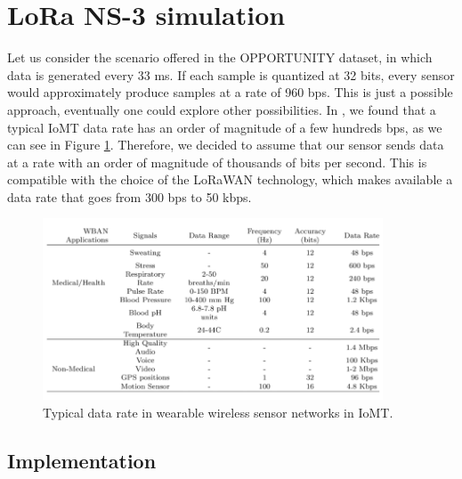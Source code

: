 \documentclass[10pt, a4paper, twocolumn]{article}
\theoremstyle{definition}
\begin{document}
\section{LoRa NS-3 simulation}
Let us consider the scenario offered in the OPPORTUNITY dataset, in which data is generated every 33 ms. If each sample is quantized at 32 bits, every sensor would approximately produce samples at a rate of 960 bps. This is just a possible approach, eventually one could explore other possibilities. In \cite{typical_values}, we found that a typical IoMT data rate has an order of magnitude of a few hundreds bps, as we can see in Figure \ref{fig:typical_vaulues}. Therefore, we decided to assume that our sensor sends data at a rate with an order of magnitude of thousands of bits per second. This is compatible with the choice of the LoRaWAN technology, which makes available a data rate that goes from 300 bps to 50 kbps.




\begin{figure} \centering
         \includegraphics[width=0.9\textwidth]{images/WBAN_values.PNG}
        \caption{Typical data rate in wearable wireless sensor networks in IoMT.}
    \label{fig:typical_vaulues}
\end{figure}




\subsection{Implementation}
\end{document}
